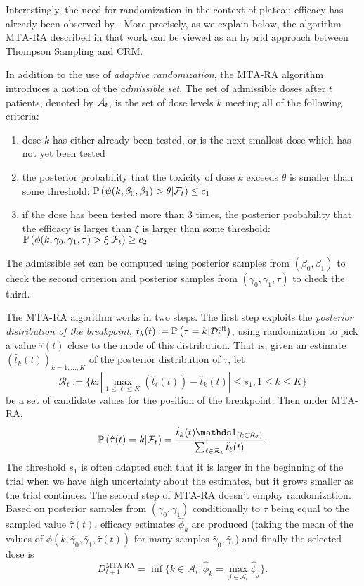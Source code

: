 Interestingly, the need for randomization in the context of plateau efficacy has already been observed by \cite{MKR17}. More precisely, as we explain below, the algorithm $\mathrm{MTA}$-$\mathrm{RA}$ described in that work can be viewed as an hybrid approach between Thompson Sampling and CRM. 

In addition to the use of \emph{adaptive randomization}, the $\mathrm{MTA}$-$\mathrm{RA}$ algorithm introduces a notion of the \emph{admissible set}. The set of admissible doses after $t$ patients, denoted by $\mathcal{A}_t$, is the set of dose levels $k$ meeting all of the following criteria:
\begin{enumerate}
    \item dose $k$ has either already been tested, or is the next-smallest dose which has not yet been tested
    \item the posterior probability that the toxicity of dose $k$ exceeds $\theta$ is smaller than some threshold: $\mathbb{P}\left(\psi(k,\beta_0,\beta_1) > \theta | \mathcal{F}_{t}\right) \leq c_1$
    \item if the dose has been tested more than $3$ times, the posterior probability that the efficacy is larger than $\xi$ is larger than some threshold: $\mathbb{P}\left(\phi(k,\gamma_0,\gamma_1,\tau) > \xi | \mathcal{F}_{t}\right) \geq c_2$
\end{enumerate}
The admissible set can be computed using posterior samples from $(\beta_0,\beta_1)$ to check the second criterion and posterior samples from $(\gamma_0,\gamma_1,\tau)$ to check the third. 

The $\mathrm{MTA}$-$\mathrm{RA}$ algorithm works in two steps. The first step exploits the \emph{posterior distribution of the breakpoint}, $t_k(t) :=\mathbb{P}\left(\tau=k | \mathcal{D}_{t}^{\text{eff}}\right)$, using randomization to pick a value $\hat{\tau}(t)$ close to the mode of this distribution. That is, given an estimate $(\hat{t}_k(t))_{k=1,\dots,K}$ of the posterior distribution of $\tau$, let
\[
\mathcal{R}_t := \Big\{
    k : \left| \max_{1 \le \ell \le K}(\hat{t}_\ell(t)) - \hat{t}_k(t) \right| \le s_1,
    1 \le k \le K
\Big\}
\]
be a set of candidate values for the position of the breakpoint. Then under $\mathrm{MTA}$-$\mathrm{RA}$, 
\[\bP\left(\hat{\tau}(t) = k |\cF_t\right) = \frac{\hat{t}_k(t)\ind_{\left(k \in \cR_t\right)}}{\sum_{\ell \in \cR_t} \hat{t}_\ell(t)}. \]
The threshold $s_1$ is often adapted such that it is larger in the beginning of the trial when we have high uncertainty about the estimates, but it grows smaller as the trial continues. The second step of $\mathrm{MTA}$-$\mathrm{RA}$ doesn't employ randomization. Based on posterior samples from $(\gamma_0,\gamma_1)$ conditionally to $\tau$ being equal to the sampled value $\hat{\tau}(t)$, efficacy estimates $\hat{\phi}_k$ are produced (taking the mean of the values of $\phi(k,\tilde{\gamma_0},\tilde{\gamma_1},\hat{\tau}(t))$ for many samples $\tilde{\gamma_0},\tilde{\gamma_1}$) and finally the selected dose is 
\[ D_{t+1}^{\text{MTA-RA}} = \inf \Big\{ k \in \mathcal{A}_t : \hat{\phi}_k = \max_{j \in \mathcal{A}_t} \hat{\phi}_j\Big\}.\]

